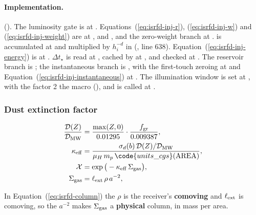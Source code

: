 \paragraph{Implementation.} 
(). The luminosity gate is at
. Equations~(\ref{eq:isrfd-inj-r}),
(\ref{eq:isrfd-inj-w}) and (\ref{eq:isrfd-inj-weight}) are at
,  and , and the
zero-weight branch at .  is accumulated at
 and multiplied by $h_i^{-d}$ in
 (, line 638).
Equation~(\ref{eq:isrfd-inj-energy}) is at .
$\Delta t_\star$ is read at , cached by
 at , and checked at
. The reservoir branch is ; the
instantaneous branch is , with the first-touch zeroing at
 and Equation~(\ref{eq:isrfd-inj-instantaneous}) at
. The illumination window is set at ,
with the factor 2 the macro 
(), and  is called at
.

\subsubsection{Dust extinction factor}
\label{sec:isrf-eqdisc-extinction}

\begin{align}
  \frac{\mathcal{D}(Z)}{\mathcal{D}_{\rm MW}} &=
    \frac{\max(Z, 0)}{0.01295}\cdot\frac{f_{\rm gr}}{0.009387},
  \label{eq:isrfd-dust-ratio} \\
  \kappa_{\rm eff} &= \frac{\sigma_d(b)\,\mathcal{D}(Z)/\mathcal{D}_{\rm MW}}
    {\mu_H\, m_p\, \code{units\_cgs}(\mathrm{AREA})},
  \label{eq:isrfd-kappa-eff} \\
  \mathcal{X} &= \exp\big(-\kappa_{\rm eff}\, \Sigma_{\rm gas}\big),
  \label{eq:isrfd-extinction} \\
  \Sigma_{\rm gas} &= \ell_{\rm ext}\, \rho\, a^{-2},
  \label{eq:isrfd-column}
\end{align}

In Equation~(\ref{eq:isrfd-column}) the
$\rho$ is the receiver's \textbf{comoving}  and $\ell_{\rm ext}$ is
comoving, so the $a^{-2}$ makes $\Sigma_{\rm gas}$ a \textbf{physical} column, in
mass per area.


